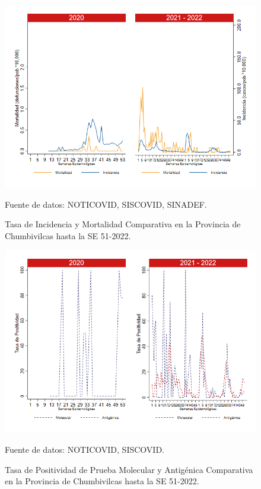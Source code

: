 \documentclass[12pt,a4paper,openany]{book}
\begin{document}
	\begin{figure}[h]
		\caption{Tasa de Incidencia y Mortalidad Comparativa en la Provincia de Chumbivilcas hasta la SE 51-2022.}\label{fig:inc_mort_chumbivilcas}
		\begin{center}
			\includegraphics[width=0.85\linewidth]{../figuras/incidencia_mortalidad_20_21_6.png}
		\end{center}
		{\footnotesize {Fuente de datos: NOTICOVID, SISCOVID, SINADEF.}}
	\end{figure}
	
	\begin{figure}[h]
		\caption{Tasa de Positividad de Prueba Molecular y Antigénica Comparativa en la Provincia de Chumbivilcas hasta la SE 51-2022.}\label{fig:positividad_chumbivilcas}
		\begin{center}
			\includegraphics[width=0.7\linewidth]{../figuras/positividad_20_21_6.png}
		\end{center}
		{\footnotesize {Fuente de datos: NOTICOVID, SISCOVID.}}
	\end{figure}
	
\end{document}
